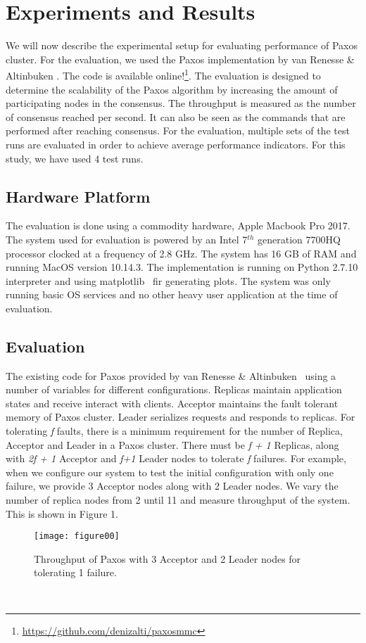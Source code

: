 \documentclass[conference, onecolumn]{IEEEtran}
\begin{document}
\section{Experiments and Results}
We will now describe the experimental setup for evaluating performance of Paxos cluster. 
For the evaluation, we used the Paxos implementation by van Renesse \& Altinbuken \cite{b3}. 
The code is available online!\footnote{\url{https://github.com/denizalti/paxosmmc}}. 
The evaluation is designed to determine the scalability of the Paxos algorithm by increasing the amount of participating nodes in the consensus. 
The throughput is measured as the number of consensus reached per second. 
It can also be seen as the commands that are performed after reaching consensus. 
For the evaluation, multiple sets of the test runs are evaluated in order to achieve average performance indicators. 
For this study, we have used 4 test runs. 

\subsection{Hardware Platform}
The evaluation is done using a commodity hardware, Apple Macbook Pro 2017. 
The system used for evaluation is powered by an Intel 7$^{th}$ generation 7700HQ processor clocked at a frequency of 2.8 GHz. 
The system has 16 GB of RAM and running MacOS version 10.14.3. 
The implementation is running on Python 2.7.10 interpreter and using matplotlib~\cite{b4} fir generating plots. 
The system was only running basic OS services and no other heavy user application at the time of evaluation. \\

\subsection{Evaluation}
The existing code for Paxos provided by van Renesse \& Altinbuken~\cite{b3} using a number of variables for different configurations. 
Replicas maintain application states and receive interact with clients. 
Acceptor maintains the fault tolerant memory of Paxos cluster. 
Leader serializes requests and responds to replicas. 
For tolerating \textit{f} faults, there is a minimum requirement for the number of Replica, Acceptor and Leader in a Paxos cluster. 
There must be \textit{f + 1} Replicas, along with \textit{2f + 1} Acceptor and \textit{f+1} Leader nodes to tolerate \textit{f} failures. 
For example, when we configure our system to test the initial configuration with only one failure, we provide 3 Acceptor nodes along with 2 Leader nodes. 
We vary the number of replica nodes from 2 until 11 and measure throughput of the system. 
This is shown in Figure 1. 
\begin{figure}
	\centering
	\label{initial}
	\texttt{[image: figure00]}
	\caption{Throughput of Paxos with 3 Acceptor and 2 Leader nodes for tolerating 1 failure.}
\end{figure}
\\
\end{document}
